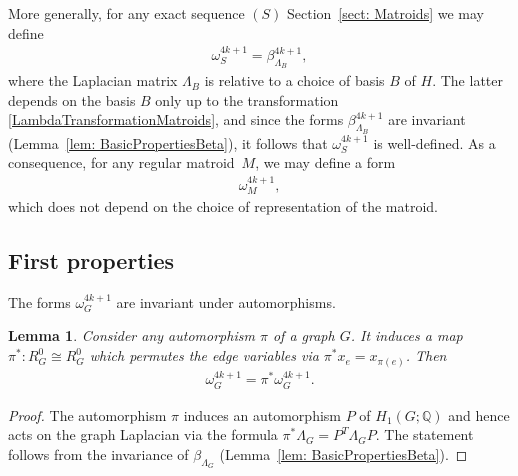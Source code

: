 \documentclass[pdftex]{sigma}%
\newtheorem{lem}[thm]{Lemma}
\numberwithin{equation}{section}
\newcommand{\Q}{\mathbb Q}
\newcommand{\0}{\color{blue}{\mathsf{0}}}
\begin{document}
\begin{rem} %
More generally, for any exact sequence $(S)$ Section~\ref{sect: Matroids} we may define
\begin{gather} \label{omega(S)}
\omega_S^{4k+1} = \beta^{4k+1}_{\Lambda_B},
\end{gather}
where the Laplacian matrix $\Lambda_B$ is relative to a choice of basis $B$ of $H$. The latter depends on the basis $B$ only up to the transformation \eqref{LambdaTransformationMatroids}, and since the forms $\beta^{4k+1}_{\Lambda_B}$ are invariant (Lemma~\ref{lem: BasicPropertiesBeta}), it follows that $\omega_S^{4k+1}$ is well-defined.
As a consequence, for any regular matroid~$M$, we may define a form
\begin{gather*} %
\omega_M^{4k+1},
\end{gather*}
which does not depend on the choice of representation of the matroid.
\end{rem}

\subsection{First properties} The forms $\omega_G^{4k+1}$ are invariant under automorphisms.

\begin{lem} \label{lem: autoinvariant} Consider any automorphism $\pi$ of a graph $G$. It induces a map $\pi^*\colon R^0_G \cong R^0_G$ which permutes the edge variables via $\pi^* x_e = x_{\pi(e)}$. Then
\begin{gather*}
\omega^{4k+1}_G = \pi^* \omega^{4k+1}_G .
\end{gather*}
\end{lem}
\begin{proof} The automorphism $\pi$ induces an automorphism $P$ of $H_1(G;\Q)$ and hence acts on the graph Laplacian via the formula $\pi^* \Lambda_{G} = P^{T} \Lambda_{G} P$.
The statement follows from the invariance of $\beta_{\Lambda_{G}}$ (Lemma~\ref{lem: BasicPropertiesBeta}).
\end{proof}
\end{document}
